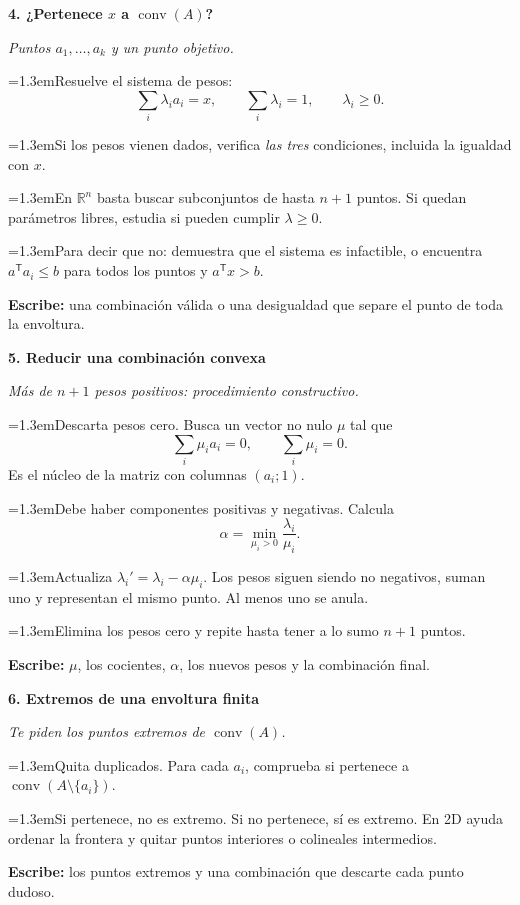 \documentclass[a4paper,landscape]{article}
\newcommand{\R}{\mathbb R}
\newcommand{\T}{^{\mathsf T}}
\newcommand{\caso}[2]{\par\vspace{5pt}\colorbox{pale}{\parbox{\dimexpr\linewidth-2\fboxsep}{\bfseries\color{accent}#1}}\par\textit{#2}\par}
\newcommand{\paso}[2]{\par\hangindent=1.3em\hangafter=1\makebox[1.3em][l]{\textbf{\color{accent}#1}}#2}
\newcommand{\escribe}[1]{\par\textbf{Escribe:} #1}
\newcommand{\columna}[1]{\begin{minipage}[t]{0.319\textwidth}\fontsize{9.2}{10.6}\selectfont\RaggedRight #1\end{minipage}}
\begin{document}
\columna{
\caso{4. ¿Pertenece \(x\) a \(\operatorname{conv}(A)\)?}{Puntos \(a_1,\ldots,a_k\) y un punto objetivo.}
\paso{1.}{Resuelve el sistema de pesos:
\[\sum_i\lambda_i a_i=x,\qquad\sum_i\lambda_i=1,\qquad\lambda_i\ge0.\]}
\paso{2.}{Si los pesos vienen dados, verifica \emph{las tres} condiciones, incluida la igualdad con \(x\).}
\paso{3.}{En \(\R^n\) basta buscar subconjuntos de hasta \(n+1\) puntos. Si quedan parámetros libres, estudia si pueden cumplir \(\lambda\ge0\).}
\paso{4.}{Para decir que no: demuestra que el sistema es infactible, o encuentra \(a\T a_i\le b\) para todos los puntos y \(a\T x>b\).}
\escribe{una combinación válida o una desigualdad que separe el punto de toda la envoltura.}

\caso{5. Reducir una combinación convexa}{Más de \(n+1\) pesos positivos: procedimiento constructivo.}
\paso{1.}{Descarta pesos cero. Busca un vector no nulo \(\mu\) tal que
\[\sum_i\mu_i a_i=0,\qquad\sum_i\mu_i=0.\]
Es el núcleo de la matriz con columnas \((a_i;1)\).}
\paso{2.}{Debe haber componentes positivas y negativas. Calcula
\[\alpha=\min_{\mu_i>0}\frac{\lambda_i}{\mu_i}.\]}
\paso{3.}{Actualiza \(\lambda_i'=\lambda_i-\alpha\mu_i\). Los pesos siguen siendo no negativos, suman uno y representan el mismo punto. Al menos uno se anula.}
\paso{4.}{Elimina los pesos cero y repite hasta tener a lo sumo \(n+1\) puntos.}
\escribe{\(\mu\), los cocientes, \(\alpha\), los nuevos pesos y la combinación final.}

\caso{6. Extremos de una envoltura finita}{Te piden los puntos extremos de \(\operatorname{conv}(A)\).}
\paso{1.}{Quita duplicados. Para cada \(a_i\), comprueba si pertenece a \(\operatorname{conv}(A\setminus\{a_i\})\).}
\paso{2.}{Si pertenece, no es extremo. Si no pertenece, sí es extremo. En 2D ayuda ordenar la frontera y quitar puntos interiores o colineales intermedios.}
\escribe{los puntos extremos y una combinación que descarte cada punto dudoso.}
}
\hfill
\end{document}

